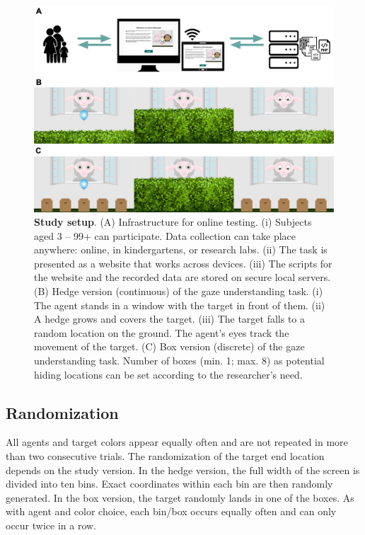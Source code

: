 \documentclass[
  man,floatsintext]{apa6}
\begin{document}
\begin{figure}

{\centering \includegraphics[width=1\linewidth]{../figures/gafo_procedure} 

}

\caption{\textbf{Study setup}. (A) Infrastructure for online testing. (i) Subjects aged 3 -- 99+ can participate. Data collection can take place anywhere: online, in kindergartens, or research labs. (ii) The task is presented as a website that works across devices. (iii) The scripts for the website and the recorded data are stored on secure local servers. (B) Hedge version (continuous) of the gaze understanding task. (i) The agent stands in a window with the target in front of them. (ii) A hedge grows and covers the target. (iii) The target falls to a random location on the ground. The agent's eyes track the movement of the target. (C) Box version (discrete) of the gaze understanding task. Number of boxes (min. 1; max. 8) as potential hiding locations can be set according to the researcher's need.}\label{fig:fig1}
\end{figure}

\hypertarget{randomization}{%
\subsection{Randomization}\label{randomization}}

All agents and target colors appear equally often and are not repeated in more than two consecutive trials.
The randomization of the target end location depends on the study version.
In the hedge version, the full width of the screen is divided into ten bins.
Exact coordinates within each bin are then randomly generated.
In the box version, the target randomly lands in one of the boxes.
As with agent and color choice, each bin/box occurs equally often and can only occur twice in a row.
\end{document}
